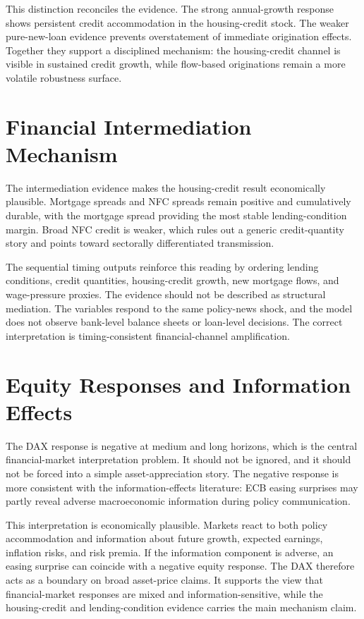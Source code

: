 This distinction reconciles the evidence. The strong annual-growth response shows persistent credit accommodation in the housing-credit stock. The weaker pure-new-loan evidence prevents overstatement of immediate origination effects. Together they support a disciplined mechanism: the housing-credit channel is visible in sustained credit growth, while flow-based originations remain a more volatile robustness surface.

\section{Financial Intermediation Mechanism}

The intermediation evidence makes the housing-credit result economically plausible. Mortgage spreads and NFC spreads remain positive and cumulatively durable, with the mortgage spread providing the most stable lending-condition margin. Broad NFC credit is weaker, which rules out a generic credit-quantity story and points toward sectorally differentiated transmission.

The sequential timing outputs reinforce this reading by ordering lending conditions, credit quantities, housing-credit growth, new mortgage flows, and wage-pressure proxies. The evidence should not be described as structural mediation. The variables respond to the same policy-news shock, and the model does not observe bank-level balance sheets or loan-level decisions. The correct interpretation is timing-consistent financial-channel amplification.

\section{Equity Responses and Information Effects}

The DAX response is negative at medium and long horizons, which is the central financial-market interpretation problem. It should not be ignored, and it should not be forced into a simple asset-appreciation story. The negative response is more consistent with the information-effects literature: ECB easing surprises may partly reveal adverse macroeconomic information during policy communication.

This interpretation is economically plausible. Markets react to both policy accommodation and information about future growth, expected earnings, inflation risks, and risk premia. If the information component is adverse, an easing surprise can coincide with a negative equity response. The DAX therefore acts as a boundary on broad asset-price claims. It supports the view that financial-market responses are mixed and information-sensitive, while the housing-credit and lending-condition evidence carries the main mechanism claim.

